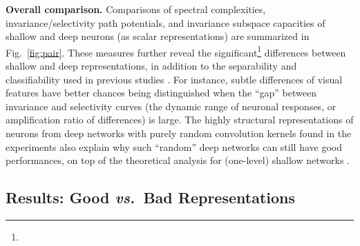 \documentclass[10pt,twocolumn,letterpaper]{article}
\begin{document}
{\bf Overall comparison.} Comparisons of spectral complexities, invariance/selectivity path potentials, and invariance subspace capacities of shallow and deep neurons (as scalar representations) are summarized in Fig.~\ref{fig:pair}.
These measures further reveal the significant\footnote{} differences between shallow and deep representations, in addition to the separability and classifiability used in previous studies \cite{donahue2014decaf, zeiler2014visualizing}.
For instance, subtle differences of visual features have better chances being distinguished when the ``gap'' between invariance and selectivity curves (\ie the dynamic range of neuronal responses, or amplification ratio of differences) is large. 
The highly structural representations of neurons from deep networks with purely random convolution kernels found in the experiments also explain why such ``random'' deep networks can still have good performances, on top of the theoretical analysis for (one-level) shallow networks \cite{saxe2011random}.


\subsection{Results: Good \textbf{\textit{vs.}}~Bad Representations}
\end{document}
